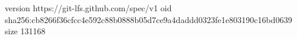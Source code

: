 version https://git-lfs.github.com/spec/v1
oid sha256:cb8266f36cfcc4e592c88b0888b05d7ce9a4daddd0323fe1e803190c16bd0639
size 131168
